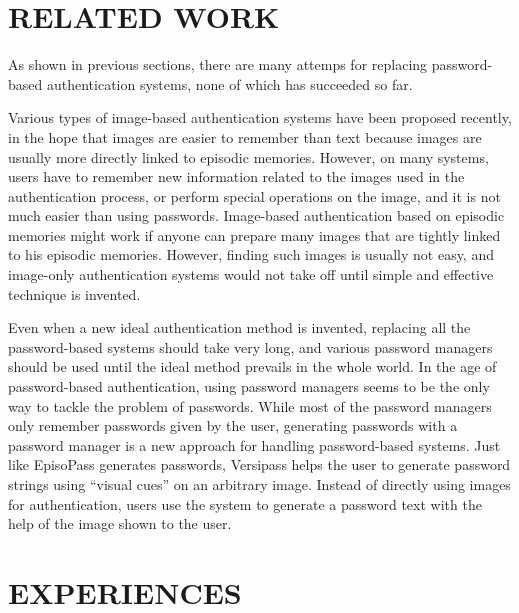 \documentclass[runningheads,a4paper]{llncs}
\begin{document}
\section{RELATED WORK}

As shown in previous sections,
there are many attemps for replacing password-based authentication systems,
none of which has succeeded so far.

Various types of image-based authentication systems have been proposed recently,
in the hope that images are easier to remember than text
because images are usually more directly linked to episodic memories.
However, on many systems,
users have to remember new information related to the images
used in the authentication process, or
perform special operations on the image, and
it is not much easier than using passwords.
%
Image-based authentication based on episodic memories might work
if anyone can prepare many images 
that are tightly linked to his episodic memories.
However, finding such images is usually not easy, and
image-only authentication systems would not take off
until simple and effective technique is invented.

Even when a new ideal authentication method is invented,
replacing all the password-based systems should take very long, and
various password managers should be used until the ideal method
prevails in the whole world.
In the age of password-based authentication,
using password managers seems to be the only way to tackle
the problem of passwords.
%
While most of the password managers only remember passwords given by the user,
generating passwords with a password manager is a new approach for
handling password-based systems.
Just like EpisoPass generates passwords,
Versipass\cite{Stobert:2014:PMD:2683467.2683471} %
helps the user to generate password strings
using ``visual cues'' on an arbitrary image.
Instead of directly using images for authentication,
users use the system to generate a password text with the help of
the image shown to the user.

% 
% 
% 
% 
% 
%

\section{EXPERIENCES}
\end{document}
